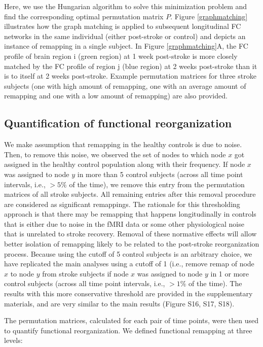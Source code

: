 \documentclass[phd,tocprelim]{cornell}
\begin{document}
	Here, we use the Hungarian algorithm to solve this minimization problem and find the corresponding optimal permutation matrix $P$. Figure \ref{graphmatching} illustrates how the graph matching is applied to subsequent longitudinal FC networks in the same individual (either post-stroke or control) and depicts an instance of remapping in a single subject.  In Figure \ref{graphmatching}A, the FC profile of brain region i (green region) at 1 week post-stroke is more closely matched by the FC profile of region j (blue region) at 2 weeks post-stroke than it is to itself at 2 weeks post-stroke. Example permutation matrices for three stroke subjects (one with high amount of remapping, one with an average amount of remapping and one with a low amount of remapping) are also provided. 
	
	\subsection{Quantification of functional reorganization}
	
	We make assumption that remapping in the healthy controls is due to noise. Then, to remove this noise, we observed the set of nodes to which node $x$ got assigned in the healthy control population along with their frequency. If node $x$ was assigned to node $y$ in more than 5 control subjects (across all time point intervals, i.e., $> 5 \%$ of the time), we remove this entry from the permutation matrices of all stroke subjects. All remaining entries after this removal procedure are considered as significant remappings. The rationale for this thresholding approach is that there may be remapping that happens longitudinally in controls that is either due to noise in the fMRI data or some other physiological noise that is unrelated to stroke recovery. Removal of these normative effects will allow better isolation of remapping likely to be related to the post-stroke reorganization process. Because using the cutoff of 5 control subjects is an arbitrary choice, we have replicated the main analyses using a cutoff of 1 (i.e., remove remap of node $x$ to node $y$ from stroke subjects if node $x$ was assigned to node $y$ in 1 or more control subjects (across all time point intervals, i.e., $> 1 \%$ of the time). The results with this more conservative threshold are provided in the supplementary materials, and are very similar to the main results (Figure S16, S17, S18).

	The permutation matrices, calculated for each pair of time points, were then used to quantify functional reorganization. We defined functional remapping at three levels:
	
\end{document}

